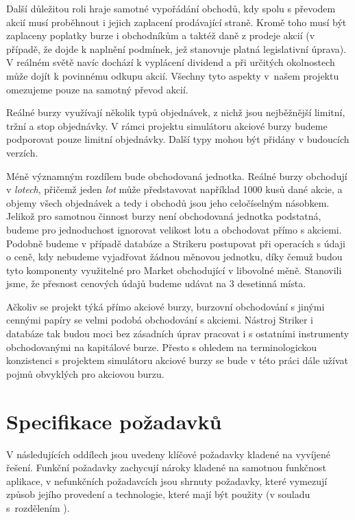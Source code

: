 \documentclass[thesis=M,czech]{FITthesis}[2012/06/26]
\begin{document}
Další důležitou roli hraje samotné vypořádání obchodů, kdy spolu s převodem akcií musí proběhnout i jejich zaplacení prodávající 
straně. Kromě toho musí být zaplaceny poplatky burze i obchodníkům a taktéž daně z prodeje akcií (v případě, že dojde k naplnění 
podmínek, jež stanovuje platná legislativní úprava). V reálném světě navíc dochází k vyplácení dividend a při určitých okolnostech 
může dojít k povinnému odkupu akcií. Všechny tyto aspekty v~našem projektu omezujeme pouze na samotný převod akcií.

Reálné burzy využívají několik typů objednávek, z nichž jsou nejběžnější limitní, tržní a stop objednávky. V rámci projektu 
simulátoru akciové burzy budeme podporovat pouze limitní objednávky. Další typy mohou být přidány v budoucích verzích.

Méně významným rozdílem bude obchodovaná jednotka. Reálné burzy obchodují v \textit{lotech}, přičemž jeden \textit{lot}
může představovat například 1000 kusů dané akcie, a objemy všech objednávek a tedy i obchodů jsou jeho celočíselným násobkem. 
Jelikož pro samotnou činnost burzy není obchodovaná jednotka podstatná, budeme pro jednoduchost ignorovat velikost lotu 
a obchodovat přímo s akciemi. Podobně budeme v případě databáze a Strikeru postupovat při operacích s údaji o ceně, kdy 
nebudeme vyjadřovat žádnou měnovou jednotku, díky čemuž budou tyto komponenty využitelné pro Market obchodující 
v libovolné měně. Stanovili jsme, že přesnost cenových údajů budeme udávat na 3 desetinná místa.

Ačkoliv se projekt týká přímo akciové burzy, burzovní obchodování s jinými cennými papíry se velmi podobá obchodování 
s akciemi. Nástroj Striker i databáze tak budou moci bez zásadních úprav pracovat i s ostatními instrumenty obchodovanými 
na kapitálové burze. Přesto s ohledem na terminologickou konzistenci s projektem simulátoru akciové burzy se bude v této
práci dále užívat pojmů obvyklých pro akciovou burzu.




\section{Specifikace požadavků}

V následujících oddílech jsou uvedeny klíčové požadavky kladené na vyvíjené řešení. Funkční požadavky zachycují nároky 
kladené na samotnou funkčnost aplikace, v nefunkčních požadavcích jsou shrnuty požadavky, které vymezují způsob 
jejího provedení a technologie, které mají být použity (v souladu s~rozdělením \cite{umlsroz}).
\end{document}
